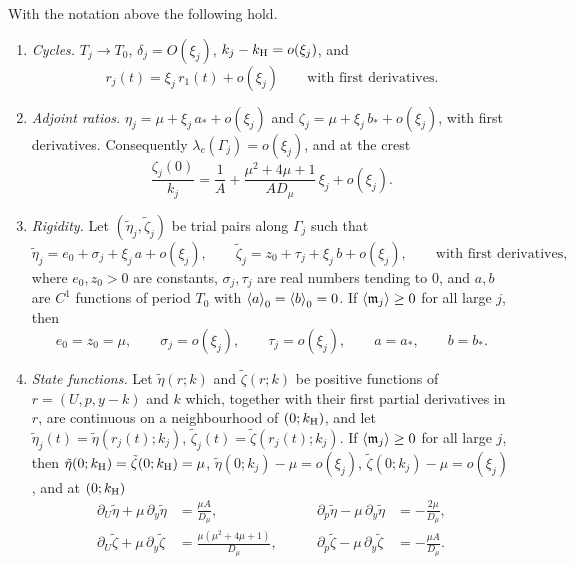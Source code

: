 \begin{lemma}\label{lem:rigidity}
With the notation above the following hold.
\begin{enumerate}[label=\textup{(\roman*)}]
\item \emph{Cycles.} $T_j\to T_0$, $\delta_j=O(\xi_j)$, $k_j-k_{\mathrm H}=o(\xi_j)$, and
\[
r_j(t)=\xi_j\,r_1(t)+o(\xi_j)\qquad\text{with first derivatives.}
\]
\item \emph{Adjoint ratios.} $\eta_j=\mu+\xi_j\,a_*+o(\xi_j)$ and $\zeta_j=\mu+\xi_j\,b_*+o(\xi_j)$, with first derivatives. Consequently $\lambda_c(\Gamma_j)=o(\xi_j)$, and at the crest
\[
\frac{\zeta_j(0)}{k_j}=\frac1A+\frac{\mu^2+4\mu+1}{AD_\mu}\,\xi_j+o(\xi_j).
\]
\item \emph{Rigidity.} Let $(\tilde\eta_j,\tilde\zeta_j)$ be trial pairs along $\Gamma_j$ such that
\[
\tilde\eta_j=e_0+\sigma_j+\xi_j\,a+o(\xi_j),\qquad \tilde\zeta_j=z_0+\tau_j+\xi_j\,b+o(\xi_j),\qquad\text{with first derivatives,}
\]
where $e_0,z_0>0$ are constants, $\sigma_j,\tau_j$ are real numbers tending to $0$, and $a,b$ are $C^1$ functions of period $T_0$ with $\left\langle a\right\rangle_0=\left\langle b\right\rangle_0=0$. If $\left\langle \mathfrak m_j\right\rangle\ge0$ for all large $j$, then
\[
e_0=z_0=\mu,\qquad \sigma_j=o(\xi_j),\qquad \tau_j=o(\xi_j),\qquad a=a_*,\qquad b=b_* .
\]
\item \emph{State functions.} Let $\tilde\eta(r;k)$ and $\tilde\zeta(r;k)$ be positive functions of $r=(U,p,y-k)$ and $k$ which, together with their first partial derivatives in $r$, are continuous on a neighbourhood of $(0;k_{\mathrm H})$, and let $\tilde\eta_j(t)=\tilde\eta(r_j(t);k_j)$, $\tilde\zeta_j(t)=\tilde\zeta(r_j(t);k_j)$. If $\left\langle \mathfrak m_j\right\rangle\ge0$ for all large $j$, then $\tilde\eta(0;k_{\mathrm H})=\tilde\zeta(0;k_{\mathrm H})=\mu$, $\tilde\eta(0;k_j)-\mu=o(\xi_j)$, $\tilde\zeta(0;k_j)-\mu=o(\xi_j)$, and at $(0;k_{\mathrm H})$
\begin{equation}\label{neg:eq:jet}
\begin{aligned}
\partial_U\tilde\eta+\mu\,\partial_y\tilde\eta&=\frac{\mu A}{D_\mu},&\qquad \partial_p\tilde\eta-\mu\,\partial_y\tilde\eta&=-\frac{2\mu}{D_\mu},\\
\partial_U\tilde\zeta+\mu\,\partial_y\tilde\zeta&=\frac{\mu(\mu^2+4\mu+1)}{D_\mu},&\qquad \partial_p\tilde\zeta-\mu\,\partial_y\tilde\zeta&=-\frac{\mu A}{D_\mu}.
\end{aligned}
\end{equation}
\end{enumerate}
\end{lemma}
